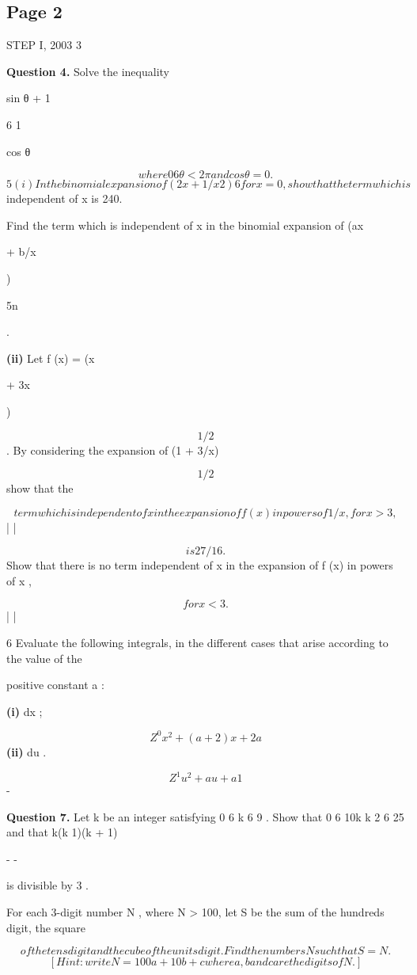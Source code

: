 \documentclass[12pt]{article}
\begin{document}
\subsection*{Page 2}
\begin{flushleft}
STEP I, 2003 3\par
\bigskip\textbf{Question 4.} Solve the inequality\par
sin θ + 1\par
6 1\par
cos θ\par
\[where 0 6 θ < 2\pi and cos θ = 0 .\]
\[5 (i) In the binomial expansion of (2x + 1/x 2 ) 6 for x = 0, show that the term which is\]
independent of x is 240.\par
Find the term which is independent of x in the binomial expansion of (ax\par
+ b/x\par
)\par
5n\par
.\par
\textbf{(ii)} Let f (x) = (x\par
+ 3x\par
)\par
\[1/2\]
. By considering the expansion of (1 + 3/x)\par
\[1/2\]
show that the\par
\[term which is independent of x in the expansion of f (x) in powers of 1/x , for x > 3 ,\]
| |\par
\[is 27/16 .\]
Show that there is no term independent of x in the expansion of f (x) in powers of x ,\par
\[for x < 3 .\]
| |\par
6 Evaluate the following integrals, in the different cases that arise according to the value of the\par
positive constant a :\par
\textbf{(i)} dx ;\par
\[Z^0 x^2 + (a + 2)x + 2a\]
\textbf{(ii)} du .\par
\[Z^1 u^2 + au + a 1\]
-\par
\bigskip\textbf{Question 7.} Let k be an integer satisfying 0 6 k 6 9 . Show that 0 6 10k k 2 6 25 and that k(k 1)(k + 1)\par
- -\par
is divisible by 3 .\par
For each 3-digit number N , where N > 100, let S be the sum of the hundreds digit, the square\par
\[of the tens digit and the cube of the units digit. Find the numbers N such that S = N .\]
\[[Hint: write N = 100a + 10b + c where a , b and c are the digits of N .]\]
\end{flushleft}
\end{document}
